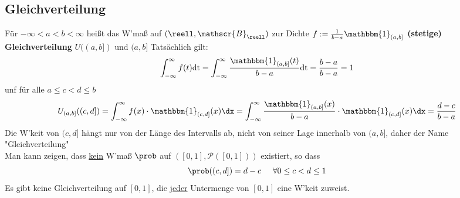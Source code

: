 \documentclass{kit}
\begin{document}
  \subsection{Gleichverteilung}
    Für $-\infty<a<b<\infty$ heißt das W'maß auf $(\reell,\mathscr{B}_\reell)$ zur Dichte 
    $f:=\frac{1}{b-a}\mathbbm{1}_{(a,b]}$ \textbf{(stetige) Gleichverteilung} $U((a,b])$ und $(a,b]$
    Tatsächlich gilt:
    $$\int^\infty_{-\infty}f(t)\text{dt}=\int^\infty_{-\infty}\frac{\mathbbm{1}_{(a,b]}(t)}{b-a}\text{dt}
    =\frac{b-a}{b-a}=1$$
    unf für alle $a\le c<d\le b$
    $$U_{(a,b]}((c,d])=\int^\infty_{-\infty}f(x)\cdot\mathbbm{1}_{(c,d]}(x)\dx
    =\int^\infty_{-\infty}\frac{\mathbbm{1}_{(a,b]}(x)}{b-a}\cdot\mathbbm{1}_{(c,d]}(x)\dx=\frac{d-c}{b-a}$$
    Die W'keit von $(c,d]$ hängt nur von der Länge des Intervalls ab, nicht von seiner Lage innerhalb von $(a,b]$, daher
    der Name "Gleichverteilung"\\
    Man kann zeigen, dass \underline{kein} W'maß $\prob$ auf $([0,1],\mathscr{P}([0,1]))$ existiert, so dass
    $$\prob((c,d])=d-c\hspace{0.5cm}\forall0\le c<d\le 1$$
    Es gibt keine Gleichverteilung auf $[0,1]$, die \underline{jeder} Untermenge von $[0,1]$ eine W'keit zuweist.
\end{document}
